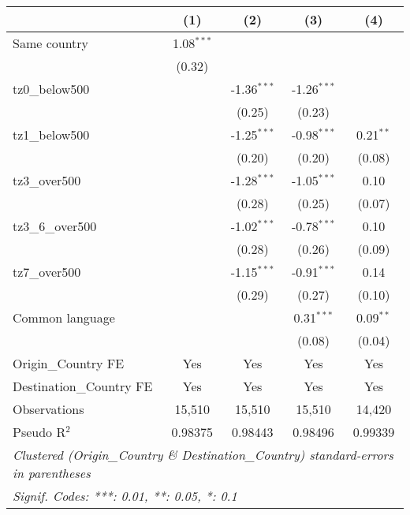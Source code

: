 
\begingroup
\centering
\small
\begin{tabular}{lcccc}
   \toprule
                            & (1)          & (2)           & (3)           & (4)\\  
   \midrule 
   Same country             & 1.08$^{***}$ &               &               &   \\   
                            & (0.32)       &               &               &   \\   
   tz0\_below500            &              & -1.36$^{***}$ & -1.26$^{***}$ &   \\   
                            &              & (0.25)        & (0.23)        &   \\   
   tz1\_below500            &              & -1.25$^{***}$ & -0.98$^{***}$ & 0.21$^{**}$\\   
                            &              & (0.20)        & (0.20)        & (0.08)\\   
   tz3\_over500             &              & -1.28$^{***}$ & -1.05$^{***}$ & 0.10\\   
                            &              & (0.28)        & (0.25)        & (0.07)\\   
   tz3\_6\_over500          &              & -1.02$^{***}$ & -0.78$^{***}$ & 0.10\\   
                            &              & (0.28)        & (0.26)        & (0.09)\\   
   tz7\_over500             &              & -1.15$^{***}$ & -0.91$^{***}$ & 0.14\\   
                            &              & (0.29)        & (0.27)        & (0.10)\\   
   Common language          &              &               & 0.31$^{***}$  & 0.09$^{**}$\\   
                            &              &               & (0.08)        & (0.04)\\   
   \midrule 
   Origin\_Country FE       & Yes          & Yes           & Yes           & Yes\\  
   Destination\_Country FE  & Yes          & Yes           & Yes           & Yes\\  
   \midrule 
   Observations             & 15,510       & 15,510        & 15,510        & 14,420\\  
   Pseudo R$^2$             & 0.98375      & 0.98443       & 0.98496       & 0.99339\\  
   \bottomrule
   \multicolumn{5}{l}{\emph{Clustered (Origin\_Country \& Destination\_Country) standard-errors in parentheses}}\\
   \multicolumn{5}{l}{\emph{Signif. Codes: ***: 0.01, **: 0.05, *: 0.1}}\\
\end{tabular}
\par\endgroup


